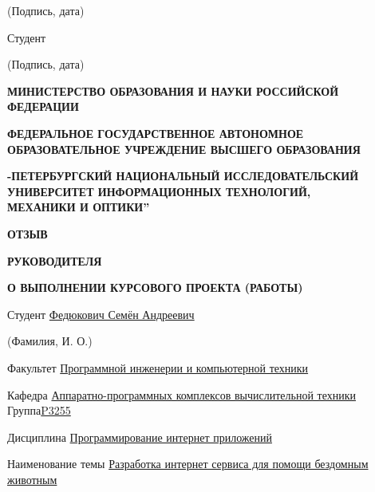 \documentclass[12pt]{article}
\begin{document}
\hspace{8cm} \scriptsize (Подпись, дата) 

\bigskip\bigskip\bigskip
\normalsize \noindent Студент \hrulefill

\hspace{8cm} \scriptsize (Подпись, дата) 

\normalsize

\newpage
\begin{center}
\bigskip\bigskip\bigskip\bigskip\bigskip\bigskip\bigskip\bigskip\bigskip\bigskip\bigskip\bigskip\bigskip\bigskip\bigskip\bigskip\bigskip\bigskip
\normalsize
\textbf{МИНИСТЕРСТВО ОБРАЗОВАНИЯ И НАУКИ РОССИЙСКОЙ ФЕДЕРАЦИИ}

\medskip 
\textbf{ФЕДЕРАЛЬНОЕ ГОСУДАРСТВЕННОЕ АВТОНОМНОЕ ОБРАЗОВАТЕЛЬНОЕ УЧРЕЖДЕНИЕ ВЫСШЕГО ОБРАЗОВАНИЯ}

\medskip 
\textbf{-ПЕТЕРБУРГСКИЙ НАЦИОНАЛЬНЫЙ ИССЛЕДОВАТЕЛЬСКИЙ }
\textbf{УНИВЕРСИТЕТ ИНФОРМАЦИОННЫХ ТЕХНОЛОГИЙ, }\\
\textbf{МЕХАНИКИ И ОПТИКИ\textquotedblright}

\bigskip\bigskip
\textbf{ОТЗЫВ}

\textbf{РУКОВОДИТЕЛЯ}

\textbf{О ВЫПОЛНЕНИИ КУРСОВОГО ПРОЕКТА (РАБОТЫ)} 
\bigskip\bigskip
\end{center}

\normalsize \noindent Студент \uline{\hspace{140pt}Федюкович Семён Андреевич\hspace*{\fill}}

\hspace{8cm} \scriptsize (Фамилия, И. О.) 

\normalsize \noindent Факультет \uline{\hspace{80pt}Программной инженерии и компьютерной техники\hspace*{\fill}}

\bigskip
\normalsize \noindent Кафедра \uline{ Аппаратно-программных комплексов вычислительной техники } Группа\uline{\hspace{15pt}P3255\hspace*{\fill}}
\bigskip

\normalsize \noindent Дисциплина \uline{\hspace{90pt}Программирование интернет приложений\hspace*{\fill}}
\bigskip

\normalsize \noindent Наименование темы  \uline{\hspace{20pt}Разработка интернет сервиса для помощи бездомным животным\hspace*{\fill}}
\end{document}
